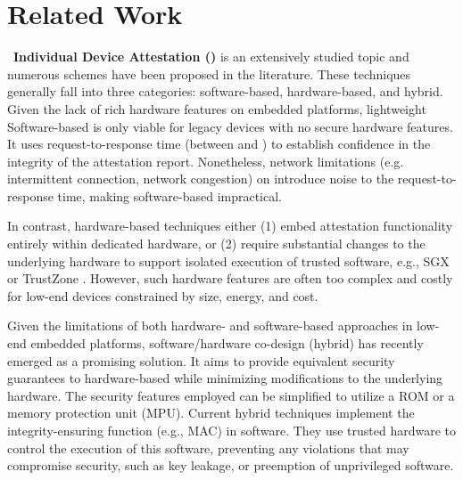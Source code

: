 \section{Related Work \label{related}}
%
\noindent~{\bf Individual Device Attestation (\ra)}
is an extensively studied topic and numerous schemes have been proposed in the literature. These 
techniques generally fall into three categories: software-based, hardware-based, and hybrid.
%
Given the lack of rich hardware features on embedded platforms, lightweight Software-based \ra 
\cite{li2011viper,seshadri2006scuba,seshadri2004swatt,surminski2021realswatt} is only viable 
for legacy devices with no secure hardware features. 
It uses request-to-response time (between \vrf and \prv) to establish confidence 
in the integrity of the attestation report.
Nonetheless, network limitations (e.g. intermittent connection, network congestion) on \prv introduce noise to the request-to-response 
time, making software-based \ra impractical.

In contrast, hardware-based \ra techniques 
\cite{mccune2010trustvisor,noorman2013sancus,strackx2010efficient,
ling2021secure,chen2019opera,chen2022mage} either (1) embed \prv attestation functionality entirely 
within dedicated hardware, 
or (2) require substantial changes to the underlying hardware to support isolated execution of trusted 
software, e.g., SGX \cite{sgx} or TrustZone \cite{trustzone}.
However, such hardware features are often too complex and costly for low-end devices constrained by 
size, energy, and cost.

Given the limitations of both hardware- and software-based approaches in low-end embedded platforms, 
software/hardware co-design (hybrid) \cite{vrased,arkannezhadida,smart,tytan,nunes2020apex,trustlite} 
has recently emerged as a promising solution. It aims to provide equivalent security guarantees to hardware-based 
\ra while minimizing modifications to the underlying hardware.
The security features employed can be simplified to utilize a ROM or a memory protection unit (MPU).
Current hybrid \ra techniques implement the integrity-ensuring function (e.g., MAC) in software.
They use trusted hardware to control the execution of this software, preventing any violations that may compromise security, such as key leakage, or preemption of unprivileged software.

